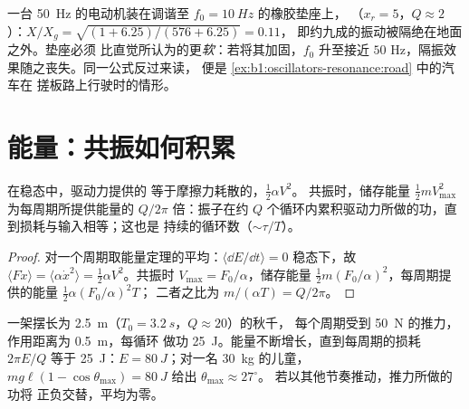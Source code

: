 \begin{example}[为什么机器要装在软垫座上]\label{ex:b1:oscillators-resonance:mounts}
一台 \qty{50}{Hz} 的电动机装在调谐至 $f_0 = \qty{10}{Hz}$ 的橡胶垫座上，
（$x_r = 5$，$Q \approx 2$）：$X/X_g = \sqrt{(1 + 6.25)/(576 + 6.25)} = 0.11$，
即约九成的振动被隔绝在地面之外。垫座必须
比直觉所认为的更\emph{软}：若将其加固，$f_0$
升至接近 $50$ Hz，隔振效果随之丧失。同一公式反过来读，
便是 \cref{ex:b1:oscillators-resonance:road} 中的汽车在
搓板路上行驶时的情形。
\end{example}

\section{能量：共振如何积累}

\begin{proposition}[受迫状态下的能量平衡]\label{prop:b1:oscillators-resonance:energy}
在稳态中，驱动力提供的
等于摩擦力耗散的，$\tfrac12\alpha V^2$。
共振时，储存能量 $\tfrac12 mV_{\max}^2$ 为每周期所提供能量的
$Q/2\pi$ 倍：振子在约
$Q$ 个循环内累积驱动力所做的功，直到损耗与输入相等；这也是
持续的循环数（$\sim\tau/T$）。
\end{proposition}

\begin{proof}
对一个周期取能量定理的平均：$\langle\dd E/\dd t\rangle = 0$
稳态下，故 $\langle F\dot x\rangle = \langle\alpha\dot x^2\rangle =
\tfrac12\alpha V^2$。共振时 $V_{\max} = F_0/\alpha$，储存能量
$\tfrac12 m(F_0/\alpha)^2$，每周期提供的能量 $\tfrac12\alpha(F_0/\alpha)^2T$；
二者之比为 $m/(\alpha T) = Q/2\pi$。
\end{proof}

\begin{example}[秋千]\label{ex:b1:oscillators-resonance:swing}
一架摆长为 \qty{2.5}{m}（$T_0 = \qty{3.2}{s}$，$Q \approx 20$）的秋千，
每个周期受到 \qty{50}{N} 的推力，作用距离为 \qty{0.5}{m}，每循环
做功 \qty{25}{J}。能量不断增长，直到每周期的损耗 $2\pi E/Q$ 等于
\qty{25}{J}：$E = \qty{80}{J}$；对一名 \qty{30}{kg} 的儿童，$mg\ell(1 -
\cos\theta_{\max}) = \qty{80}{J}$ 给出 $\theta_{\max} \approx 27^\circ$。
若以其他节奏推动，推力所做的功将
正负交替，平均为零。
\end{example}

